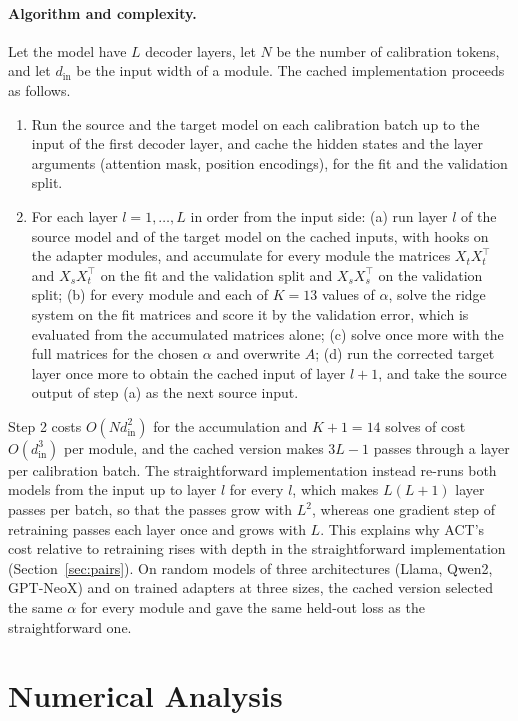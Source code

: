 \documentclass[ijoc,nonblindrev]{informs4}
\begin{document}
\paragraph{Algorithm and complexity.} Let the model have $L$ decoder layers, let $N$ be the number of calibration tokens, and let $d_{\text{in}}$ be the input width of a module. The cached implementation proceeds as follows.
\begin{enumerate}
\item Run the source and the target model on each calibration batch up to the input of the first decoder layer, and cache the hidden states and the layer arguments (attention mask, position encodings), for the fit and the validation split.
\item For each layer $l=1,\dots,L$ in order from the input side: (a) run layer $l$ of the source model and of the target model on the cached inputs, with hooks on the adapter modules, and accumulate for every module the matrices $X_tX_t^{\top}$ and $X_sX_t^{\top}$ on the fit and the validation split and $X_sX_s^{\top}$ on the validation split; (b) for every module and each of $K=13$ values of $\alpha$, solve the ridge system on the fit matrices and score it by the validation error, which is evaluated from the accumulated matrices alone; (c) solve once more with the full matrices for the chosen $\alpha$ and overwrite $A$; (d) run the corrected target layer once more to obtain the cached input of layer $l+1$, and take the source output of step (a) as the next source input.
\end{enumerate}
Step 2 costs $O(Nd_{\text{in}}^2)$ for the accumulation and $K+1=14$ solves of cost $O(d_{\text{in}}^3)$ per module, and the cached version makes $3L-1$ passes through a layer per calibration batch. The straightforward implementation instead re-runs both models from the input up to layer $l$ for every $l$, which makes $L(L+1)$ layer passes per batch, so that the passes grow with $L^2$, whereas one gradient step of retraining passes each layer once and grows with $L$. This explains why ACT's cost relative to retraining rises with depth in the straightforward implementation (Section~\ref{sec:pairs}). On random models of three architectures (Llama, Qwen2, GPT-NeoX) and on trained adapters at three sizes, the cached version selected the same $\alpha$ for every module and gave the same held-out loss as the straightforward one.

\section{Numerical Analysis}\label{sec:numerical}
\end{document}
